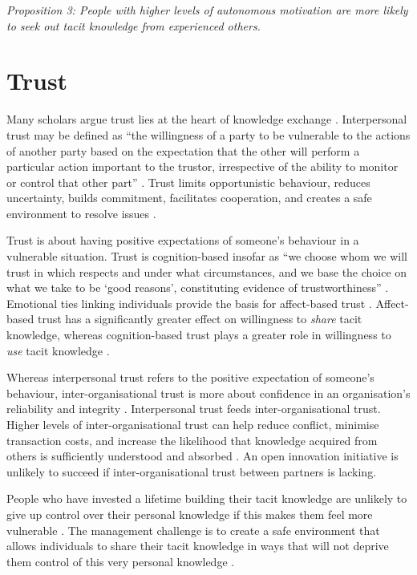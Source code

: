 \emph{Proposition 3: People with higher levels of autonomous motivation are more likely to seek out tacit knowledge from experienced others.}

\section{Trust}

Many scholars argue trust lies at the heart of knowledge exchange \citep[e.g.][]{nonaka1994dynamic,davenport1998working,hsu2007knowledge,wang2016examining}. Interpersonal trust may be defined as \enquote{the willingness of a party to be vulnerable to the actions of another party based on the expectation that the other will perform a particular action important to the trustor, irrespective of the ability to monitor or control that other part} \citep{mayer1995integrative}. Trust limits opportunistic behaviour, reduces uncertainty, builds commitment, facilitates cooperation, and creates a safe environment to resolve issues \citep{nonaka1994dynamic,panteli2005trust,rasmussen2007work}. \medskip

Trust is about having positive expectations of someone's behaviour in a vulnerable situation. Trust is cognition-based insofar as \enquote{we choose whom we will trust in which respects and under what circumstances, and we base the choice on what we take to be \enquote{good reasons}, constituting evidence of trustworthiness} \citep{lewis1985trust}. Emotional ties linking individuals provide the basis for affect-based trust \citep{mcallister1995affect}. Affect-based trust has a significantly greater effect on willingness to \emph{share} tacit knowledge, whereas cognition-based trust plays a greater role in willingness to \emph{use} tacit knowledge \citep{levin2004strength,holste2010trust}. \medskip

Whereas interpersonal trust refers to the positive expectation of someone's behaviour, inter-organisational trust is more about confidence in an organisation's reliability and integrity \citep{zaheer1998does,ashnai2016inter}. Interpersonal trust feeds inter-organisational trust. Higher levels of inter-organisational trust can help reduce conflict, minimise transaction costs, and increase the likelihood that knowledge acquired from others is sufficiently understood and absorbed \citep{zaheer1998does,abrams2003nurturing,levin2004strength}. An open innovation initiative is unlikely to succeed if inter-organisational trust between partners is lacking. \medskip

People who have invested a lifetime building their tacit knowledge are unlikely to give up control over their personal knowledge if this makes them feel more vulnerable \citep{leonard1998role,lin2007share}. The management challenge is to create a safe environment that allows individuals to share their tacit knowledge in ways that will not deprive them control of this very personal knowledge \citep{bordum2002tacit}. \medskip

